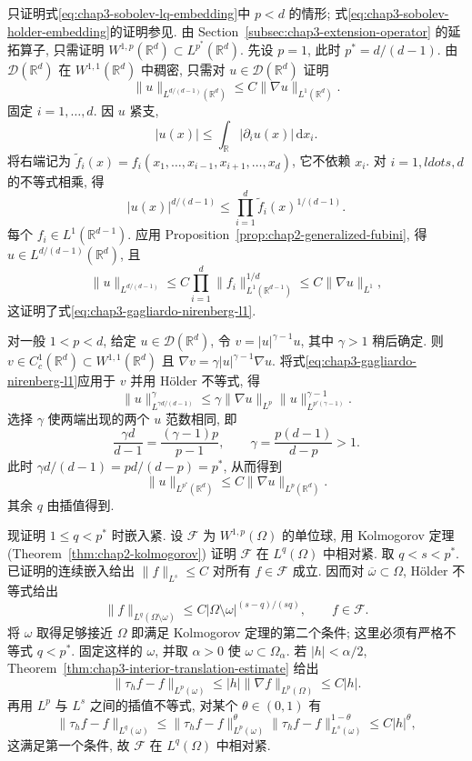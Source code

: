 \begin{Proof}
只证明式\eqref{eq:chap3-sobolev-lq-embedding}中 $p<d$ 的情形; 式\eqref{eq:chap3-sobolev-holder-embedding}的证明参见. 由 Section~\ref{subsec:chap3-extension-operator} 的延拓算子, 只需证明 $W^{1,p}(\mathbb R^d)\subset L^{p^*}(\mathbb R^d)$. 先设 $p=1$, 此时 $p^*=d/(d-1)$. 由 $\mathcal D(\mathbb R^d)$ 在 $W^{1,1}(\mathbb R^d)$ 中稠密, 只需对 $u\in\mathcal D(\mathbb R^d)$ 证明
\begin{equation}
 \|u\|_{L^{d/(d-1)}(\mathbb R^d)}\leq C\|\nabla u\|_{L^1(\mathbb R^d)}.
 \label{eq:chap3-gagliardo-nirenberg-l1}
\end{equation}
固定 $i=1,\ldots,d$. 因 $u$ 紧支,
\[
 |u(x)|\leq\int_\mathbb R|\partial_i u(x)|\,\mathrm dx_i.
\]
将右端记为 $\widetilde f_i(x)=f_i(x_1,\ldots,x_{i-1},x_{i+1},\ldots,x_d)$, 它不依赖 $x_i$. 对 $i=1,ldots,d$ 的不等式相乘, 得
\[
 |u(x)|^{d/(d-1)}\leq\prod_{i=1}^d\widetilde f_i(x)^{1/(d-1)}.
\]
每个 $f_i\in L^1(\mathbb R^{d-1})$. 应用 Proposition~\ref{prop:chap2-generalized-fubini}, 得 $u\in L^{d/(d-1)}(\mathbb R^d)$, 且
\[
 \|u\|_{L^{d/(d-1)}}\leq C\prod_{i=1}^d
 \|f_i\|_{L^1(\mathbb R^{d-1})}^{1/d}
 \leq C\|\nabla u\|_{L^1},
\]
这证明了式\eqref{eq:chap3-gagliardo-nirenberg-l1}.

对一般 $1<p<d$, 给定 $u\in\mathcal D(\mathbb R^d)$, 令 $v=|u|^{\gamma-1}u$, 其中 $\gamma>1$ 稍后确定. 则 $v\in C_c^1(\mathbb R^d)\subset W^{1,1}(\mathbb R^d)$ 且 $\nabla v=\gamma|u|^{\gamma-1}\nabla u$. 将式\eqref{eq:chap3-gagliardo-nirenberg-l1}应用于 $v$ 并用 H\"older 不等式, 得
\[
 \|u\|_{L^{\gamma d/(d-1)}}^\gamma
 \leq\gamma\|\nabla u\|_{L^p}
 \|u\|_{L^{p'(\gamma-1)}}^{\gamma-1}.
\]
选择 $\gamma$ 使两端出现的两个 $u$ 范数相同, 即
\[
 \frac{\gamma d}{d-1}=\frac{(\gamma-1)p}{p-1},
 \qquad\gamma=\frac{p(d-1)}{d-p}>1.
\]
此时 $\gamma d/(d-1)=pd/(d-p)=p^*$, 从而得到
\begin{equation}
 \|u\|_{L^{p^*}(\mathbb R^d)}\leq C\|\nabla u\|_{L^p(\mathbb R^d)}.
 \label{eq:chap3-critical-sobolev-inequality}
\end{equation}
其余 $q$ 由插值得到.

现证明 $1\leq q<p^*$ 时嵌入紧. 设 $\mathcal F$ 为 $W^{1,p}(\Omega)$ 的单位球, 用 Kolmogorov 定理 (Theorem~\ref{thm:chap2-kolmogorov}) 证明 $\mathcal F$ 在 $L^q(\Omega)$ 中相对紧. 取 $q<s<p^*$. 已证明的连续嵌入给出 $\|f\|_{L^s}\leq C$ 对所有 $f\in\mathcal F$ 成立. 因而对 $\overline\omega\subset\Omega$, H\"older 不等式给出
\[
 \|f\|_{L^q(\Omega\setminus\omega)}
 \leq C|\Omega\setminus\omega|^{(s-q)/(sq)},
 \qquad f\in\mathcal F.
\]
将 $\omega$ 取得足够接近 $\Omega$ 即满足 Kolmogorov 定理的第二个条件; 这里必须有严格不等式 $q<p^*$. 固定这样的 $\omega$, 并取 $\alpha>0$ 使 $\omega\subset\Omega_\alpha$. 若 $|h|<\alpha/2$, Theorem~\ref{thm:chap3-interior-translation-estimate} 给出
\[
 \|\tau_hf-f\|_{L^p(\omega)}\leq|h|\|\nabla f\|_{L^p(\Omega)}\leq C|h|.
\]
再用 $L^p$ 与 $L^s$ 之间的插值不等式, 对某个 $\theta\in(0,1)$ 有
\[
 \|\tau_hf-f\|_{L^q(\omega)}
 \leq\|\tau_hf-f\|_{L^p(\omega)}^\theta
 \|\tau_hf-f\|_{L^s(\omega)}^{1-\theta}
 \leq C|h|^\theta,
\]
这满足第一个条件, 故 $\mathcal F$ 在 $L^q(\Omega)$ 中相对紧.


\end{Proof}
